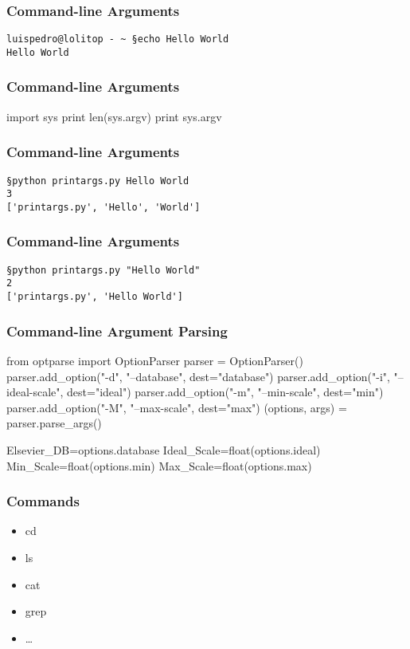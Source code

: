 \begin{frame}[fragile]
\frametitle{Command-line Arguments}

\begin{verbatim}
luispedro@lolitop - ~ §echo Hello World
Hello World
\end{verbatim}
\end{frame}

\begin{frame}[fragile]
\frametitle{Command-line Arguments}

\begin{python}
import sys
print len(sys.argv)
print sys.argv
\end{python}
\end{frame}

\begin{frame}[fragile]
\frametitle{Command-line Arguments}

\begin{verbatim}
§python printargs.py Hello World
3
['printargs.py', 'Hello', 'World']
\end{verbatim}
\end{frame}

\begin{frame}[fragile]
\frametitle{Command-line Arguments}

\begin{verbatim}
§python printargs.py "Hello World"
2
['printargs.py', 'Hello World']
\end{verbatim}
\end{frame}

\begin{frame}[fragile]
\frametitle{Command-line Argument Parsing}

\begin{python}
from optparse import OptionParser                        
parser = OptionParser()                                  
parser.add_option("-d", "--database", dest="database")   
parser.add_option("-i", "--ideal-scale", dest="ideal")   
parser.add_option("-m", "--min-scale", dest="min")       
parser.add_option("-M", "--max-scale", dest="max")       
(options, args) = parser.parse_args()                    

Elsevier_DB=options.database
Ideal_Scale=float(options.ideal)
Min_Scale=float(options.min)
Max_Scale=float(options.max)
\end{python}
\end{frame}

\begin{frame}[fragile]
\frametitle{Commands}

\begin{itemize}
\item cd
\item ls
\item cat
\item grep
\item \ldots
\end{itemize}
\end{frame}

